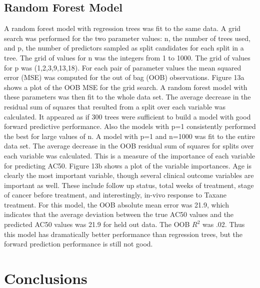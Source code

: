 \documentclass[12pt]{article}
\begin{document}
\subsection{Random Forest Model}
A random forest model with regression trees was fit to the same data.   A grid search was performed for the two parameter values: n, the number of trees used, and p, the number of predictors sampled as split candidates for each split in a tree.  The grid of values for n was the integers from 1 to 1000.  The grid of values for p was (1,2,3,9,13,18). For each pair of parameter values the mean squared error (MSE) was computed for the out of bag (OOB) observations. Figure 13a shows a plot of the OOB MSE for the grid search. A random forest model with these parameters was then fit to the whole data set.  The average decrease in the residual sum of squares that resulted from a split over each variable was calculated.  It appeared as if 300 trees were sufficient to build a model with good forward predictive performance.  Also the models with p=1 consistently performed the best for large values of n.  A model with p=1 and n=1000 was fit to the entire data set.  The average decrease in the OOB residual sum of squares for splits over each variable was calculated.  This is a measure of the importance of each variable for predicting AC50.  Figure 13b shows a plot of the variable importances.  Age is clearly the most important variable, though several clinical outcome variables are important as well.  These include follow up status, total weeks of treatment, stage of cancer before treatment, and interestingly, in-vivo response to Taxane treatment.  For this model, the OOB absolute mean error was 21.9, which indicates that the average deviation between the true AC50 values and the predicted AC50 values was 21.9 for held out data. The OOB $R^2$ was .02.  Thus this model has dramatically better performance than regression trees, but the forward prediction performance is still not good. 


\section{Conclusions}
\end{document}
